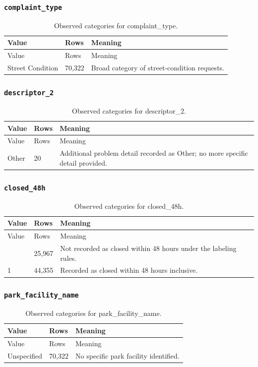 \subsubsection*{\texttt{complaint\_\allowbreak{}type}}
\begin{longtable}{@{}p{.32\linewidth}p{.09\linewidth}p{.53\linewidth}@{}}
\caption{Observed categories for complaint\_type.}\\
\toprule Value & Rows & Meaning\\\midrule\endfirsthead
\toprule Value & Rows & Meaning\\\midrule\endhead
\bottomrule\endfoot
Street Condition & 70,322 & Broad category of street-condition requests.\\
\end{longtable}
\subsubsection*{\texttt{descriptor\_\allowbreak{}2}}
\begin{longtable}{@{}p{.32\linewidth}p{.09\linewidth}p{.53\linewidth}@{}}
\caption{Observed categories for descriptor\_2.}\\
\toprule Value & Rows & Meaning\\\midrule\endfirsthead
\toprule Value & Rows & Meaning\\\midrule\endhead
\bottomrule\endfoot
Other & 20 & Additional problem detail recorded as Other; no more specific detail provided.\\
\end{longtable}
\subsubsection*{\texttt{closed\_\allowbreak{}48h}}
\begin{longtable}{@{}p{.32\linewidth}p{.09\linewidth}p{.53\linewidth}@{}}
\caption{Observed categories for closed\_48h.}\\
\toprule Value & Rows & Meaning\\\midrule\endfirsthead
\toprule Value & Rows & Meaning\\\midrule\endhead
\bottomrule\endfoot
0 & 25,967 & Not recorded as closed within 48 hours under the labeling rules.\\
1 & 44,355 & Recorded as closed within 48 hours inclusive.\\
\end{longtable}
\subsubsection*{\texttt{park\_\allowbreak{}facility\_\allowbreak{}name}}
\begin{longtable}{@{}p{.32\linewidth}p{.09\linewidth}p{.53\linewidth}@{}}
\caption{Observed categories for park\_facility\_name.}\\
\toprule Value & Rows & Meaning\\\midrule\endfirsthead
\toprule Value & Rows & Meaning\\\midrule\endhead
\bottomrule\endfoot
Unspecified & 70,322 & No specific park facility identified.\\
\end{longtable}
